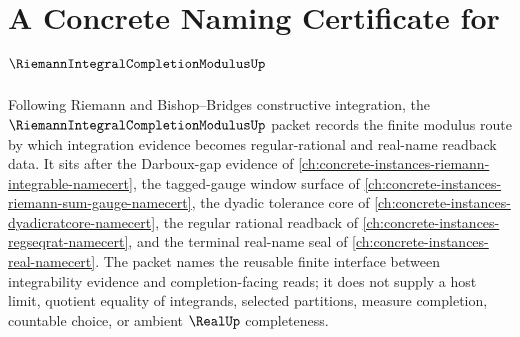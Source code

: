 \chapter{A Concrete Naming Certificate for $\RiemannIntegralCompletionModulusUp$}
\label{ch:concrete-instances-riemann-integral-completion-modulus-namecert}

Following Riemann and Bishop--Bridges constructive integration, the $\RiemannIntegralCompletionModulusUp$ packet records the finite modulus route by which integration evidence becomes regular-rational and real-name readback data. It sits after the Darboux-gap evidence of \autoref{ch:concrete-instances-riemann-integrable-namecert}, the tagged-gauge window surface of \autoref{ch:concrete-instances-riemann-sum-gauge-namecert}, the dyadic tolerance core of \autoref{ch:concrete-instances-dyadicratcore-namecert}, the regular rational readback of \autoref{ch:concrete-instances-regseqrat-namecert}, and the terminal real-name seal of \autoref{ch:concrete-instances-real-namecert}. The packet names the reusable finite interface between integrability evidence and completion-facing reads; it does not supply a host limit, quotient equality of integrands, selected partitions, measure completion, countable choice, or ambient $\RealUp$ completeness.

